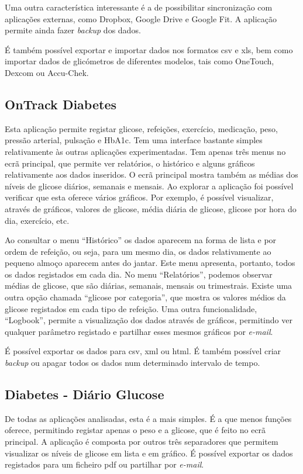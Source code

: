 Uma outra característica interessante é a de possibilitar sincronização com aplicações externas, como Dropbox, Google Drive e Google Fit. A aplicação permite ainda fazer \textit{backup} dos dados.

É também possível exportar e importar dados nos formatos csv e xls, bem como importar dados de glicómetros de diferentes modelos, tais como OneTouch, Dexcom ou Accu-Chek.

\subsection{OnTrack Diabetes}

Esta aplicação permite registar glicose, refeições, exercício, medicação, peso, pressão arterial, pulsação e HbA1c. Tem uma interface bastante simples relativamente às outras aplicações experimentadas. Tem apenas três menus no ecrã principal, que permite ver relatórios, o histórico e alguns gráficos relativamente aos dados inseridos. O ecrã principal mostra também as médias dos níveis de glicose diários, semanais e mensais. Ao explorar a aplicação foi possível verificar que esta oferece vários gráficos. Por exemplo, é possível visualizar, através de gráficos, valores de glicose, média diária de glicose, glicose por hora do dia, exercício, etc.

Ao consultar o menu ``Histórico'' os dados aparecem na forma de lista e por ordem de refeição, ou seja, para um mesmo dia, os dados relativamente ao pequeno almoço aparecem antes do jantar. Este menu apresenta, portanto, todos os dados registados em cada dia. 
No menu ``Relatórios'', podemos observar médias de glicose, que são diárias, semanais, mensais ou trimestrais. Existe uma outra opção chamada ``glicose por categoria'', que mostra os valores médios da glicose registados em cada tipo de refeição.
Uma outra funcionalidade, ``Logbook'', permite a visualização dos dados através de gráficos, permitindo ver qualquer parâmetro registado e partilhar esses mesmos gráficos por \textit{e-mail}.

É possível exportar os dados para csv, xml ou html. É também possível criar \textit{backup} ou apagar todos os dados num determinado intervalo de tempo.

\subsection{Diabetes - Diário Glucose}

De todas as aplicações analisadas, esta é a mais simples. É a que menos funções oferece, permitindo registar apenas o peso e a glicose, que é feito no ecrã principal. A aplicação é composta por outros três separadores que permitem visualizar os níveis de glicose em lista e em gráfico. É possível exportar os dados registados para um ficheiro pdf ou partilhar por \textit{e-mail}.

